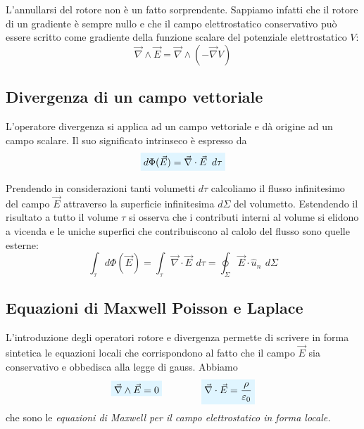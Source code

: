 \documentclass[x11names]{report}
\begin{document}
L'annullarsi del rotore non è un fatto sorprendente. Sappiamo infatti che il rotore di un gradiente è sempre nullo e che il campo elettrostatico conservativo può essere scritto come gradiente della funzione scalare del potenziale elettrostatico \(V\):
\[
\vec{\nabla} \wedge \vec{E} = \vec{\nabla} \wedge \left(-\vec{\nabla} V\right)
\]

\subsection{Divergenza di un campo vettoriale}
L'operatore divergenza si applica ad un campo vettoriale e dà origine ad un campo scalare. Il suo significato intrinseco è espresso da 
\begin{equation}
	\viola{d\Phi(\vec{E}) = \vec{\nabla}\cdot\vec{E}\,\ d\tau}
\end{equation}


Prendendo in considerazioni tanti volumetti \(d\tau\) calcoliamo il flusso infinitesimo del campo \(\vec{E}\) attraverso la superficie infinitesima \(d\Sigma\) del volumetto. Estendendo il risultato a tutto il volume \(\tau\) si osserva che i contributi interni al volume si elidono a vicenda e le uniche superfici che contribuiscono al calolo del flusso sono quelle esterne:
\[
\int_\tau d\Phi(\vec{E}) = \int_\tau  \vec{\nabla}\cdot\vec{E}\,\ d\tau = \oint_\Sigma \vec{E}\cdot\hat{u}_n \,\ d\Sigma
\]

\subsection{Equazioni di Maxwell Poisson e Laplace}
L'introduzione degli operatori rotore e divergenza permette di scrivere in forma sintetica le equazioni locali che corrispondono al fatto che il campo \(\vec{E}\) sia conservativo e obbedisca alla legge di gauss. Abbiamo
\begin{equation}
	\viola{\vec{\nabla} \wedge \vec{E} = 0} \qquad \qquad \viola{\vec{\nabla} \cdot \vec{E} = \frac{\rho}{\varepsilon_0}}
\end{equation}
che sono le \textit{equazioni di Maxwell per il campo elettrostatico in forma locale.} 
\end{document}
